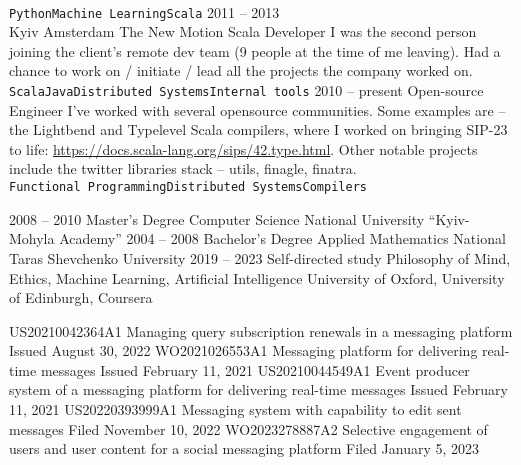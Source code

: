 \documentclass[9pt]{developercv} %
\begin{document}
\begin{entrylist}
{			\\ \texttt{Python}\slashsep\texttt{Machine Learning}\slashsep\texttt{Scala}
		}
	\entry
		{2011 -- 2013\\\footnotesize{Kyiv \newline Amsterdam}}
		{The New Motion}
		{Scala Developer}
		{
			I was the second person joining the client's remote dev team (9 people at the time of me leaving). Had a chance to work on / initiate / lead all the projects the company worked on.
			\\ \texttt{Scala}\slashsep\texttt{Java}\slashsep\texttt{Distributed Systems}\slashsep\texttt{Internal tools}
		}
	\entry
		{2010 -- present}
		{Open-source}
		{Engineer}
		{
			I've worked with several opensource communities. Some examples are -- the Lightbend and Typelevel Scala compilers, where I worked on bringing SIP-23 to life: \href{https://docs.scala-lang.org/sips/42.type.html}{https://docs.scala-lang.org/sips/42.type.html}. Other notable projects include the twitter libraries stack -- utils, finagle, finatra.\\
			\texttt{Functional Programming}\slashsep\texttt{Distributed Systems}\slashsep\texttt{Compilers}
		}
\end{entrylist}



\begin{entrylist}
	\entry
		{2008 -- 2010}
		{Master's Degree}
		{Computer Science}
		{National University “Kyiv-Mohyla Academy”}
	\entry
		{2004 -- 2008}
		{Bachelor's Degree}
		{Applied Mathematics}
		{National Taras Shevchenko University}
	\entry
		{2019 -- 2023}
		{Self-directed study}
		{Philosophy of Mind, Ethics, Machine Learning, Artificial Intelligence}
		{University of Oxford, University of Edinburgh, Coursera}
\end{entrylist}


\begin{entrylist}
	\entry
		{US20210042364A1}
		{Managing query subscription renewals in a messaging platform}
		{}
		{Issued August 30, 2022}
	\entry
		{WO2021026553A1}
		{Messaging platform for delivering real-time messages}
		{}
		{Issued February 11, 2021}
	\entry
		{US20210044549A1}
		{Event producer system of a messaging platform for delivering real-time messages}
		{}
		{Issued February 11, 2021}
	\entry
		{US20220393999A1}
		{Messaging system with capability to edit sent messages}
		{}
		{Filed November 10, 2022}
	\entry
		{WO2023278887A2}
		{Selective engagement of users and user content for a social messaging platform}
		{}
		{Filed January 5, 2023}
\end{entrylist}

\end{document}
